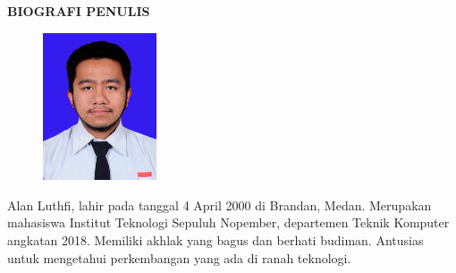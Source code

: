 \begin{center}
  \Large
  \textbf{BIOGRAFI PENULIS}
\end{center}


\vspace{2ex}

\begin{figure}
  \centering
  \vspace{-3ex}
  \includegraphics[width=0.3\textwidth]{gambar/Alan blue.png}
  \vspace{-4ex}
\end{figure}

Alan Luthfi, lahir pada tanggal 4 April 2000 di Brandan, Medan. Merupakan mahasiswa Institut Teknologi Sepuluh Nopember, departemen Teknik Komputer angkatan 2018. Memiliki akhlak yang bagus dan berhati budiman. Antusias untuk mengetahui perkembangan yang ada di ranah teknologi.

